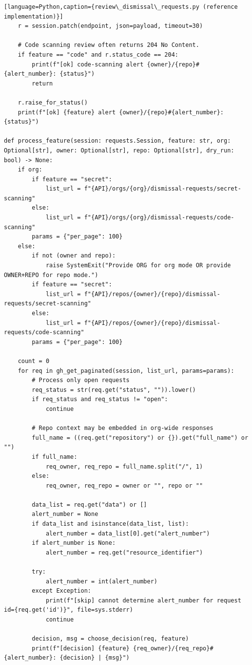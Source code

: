 \documentclass[11pt]{article}
\begin{document}
\begin{verbatim}[language=Python,caption={review\_dismissal\_requests.py (reference implementation)}]
    r = session.patch(endpoint, json=payload, timeout=30)

    # Code scanning review often returns 204 No Content.
    if feature == "code" and r.status_code == 204:
        print(f"[ok] code-scanning alert {owner}/{repo}#{alert_number}: {status}")
        return

    r.raise_for_status()
    print(f"[ok] {feature} alert {owner}/{repo}#{alert_number}: {status}")

def process_feature(session: requests.Session, feature: str, org: Optional[str], owner: Optional[str], repo: Optional[str], dry_run: bool) -> None:
    if org:
        if feature == "secret":
            list_url = f"{API}/orgs/{org}/dismissal-requests/secret-scanning"
        else:
            list_url = f"{API}/orgs/{org}/dismissal-requests/code-scanning"
        params = {"per_page": 100}
    else:
        if not (owner and repo):
            raise SystemExit("Provide ORG for org mode OR provide OWNER+REPO for repo mode.")
        if feature == "secret":
            list_url = f"{API}/repos/{owner}/{repo}/dismissal-requests/secret-scanning"
        else:
            list_url = f"{API}/repos/{owner}/{repo}/dismissal-requests/code-scanning"
        params = {"per_page": 100}

    count = 0
    for req in gh_get_paginated(session, list_url, params=params):
        # Process only open requests
        req_status = str(req.get("status", "")).lower()
        if req_status and req_status != "open":
            continue

        # Repo context may be embedded in org-wide responses
        full_name = ((req.get("repository") or {}).get("full_name") or "")
        if full_name:
            req_owner, req_repo = full_name.split("/", 1)
        else:
            req_owner, req_repo = owner or "", repo or ""

        data_list = req.get("data") or []
        alert_number = None
        if data_list and isinstance(data_list, list):
            alert_number = data_list[0].get("alert_number")
        if alert_number is None:
            alert_number = req.get("resource_identifier")

        try:
            alert_number = int(alert_number)
        except Exception:
            print(f"[skip] cannot determine alert_number for request id={req.get('id')}", file=sys.stderr)
            continue

        decision, msg = choose_decision(req, feature)
        print(f"[decision] {feature} {req_owner}/{req_repo}#{alert_number}: {decision} | {msg}")


\end{verbatim}
\end{document}
